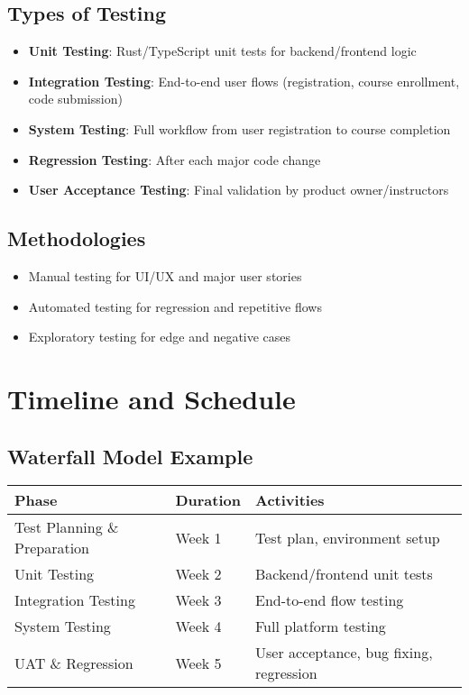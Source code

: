 \documentclass[a4paper,11pt]{scrartcl}
\begin{document}
\subsection{Types of Testing}
\begin{itemize}[leftmargin=*]
    \item \textbf{Unit Testing}: Rust/TypeScript unit tests for backend/frontend logic
    \item \textbf{Integration Testing}: End-to-end user flows (registration, course enrollment, code submission)
    \item \textbf{System Testing}: Full workflow from user registration to course completion
    \item \textbf{Regression Testing}: After each major code change
    \item \textbf{User Acceptance Testing}: Final validation by product owner/instructors
\end{itemize}

\subsection{Methodologies}
\begin{itemize}[leftmargin=*]
    \item Manual testing for UI/UX and major user stories
    \item Automated testing for regression and repetitive flows
    \item Exploratory testing for edge and negative cases
\end{itemize}

\section{Timeline and Schedule}

\subsection{Waterfall Model Example}
\begin{tabularx}{\textwidth}{l l X}
\toprule
Phase & Duration & Activities \\
\midrule
Test Planning \& Preparation & Week 1 & Test plan, environment setup \\
Unit Testing & Week 2 & Backend/frontend unit tests \\
Integration Testing & Week 3 & End-to-end flow testing \\
System Testing & Week 4 & Full platform testing \\
UAT \& Regression & Week 5 & User acceptance, bug fixing, regression \\
\bottomrule
\end{tabularx}
\end{document}
